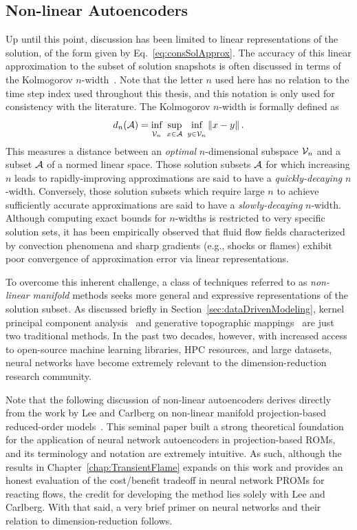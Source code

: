 \subsection{Non-linear Autoencoders}\label{subsec:nonlinManifold}

Up until this point, discussion has been limited to linear representations of the solution, of the form given by Eq.~\ref{eq:consSolApprox}. The accuracy of this linear approximation to the subset of solution snapshots is often discussed in terms of the Kolmogorov $n$-width~\cite{Pinkus1985}. Note that the letter $n$ used here has no relation to the time step index used throughout this thesis, and this notation is only used for consistency with the literature. The Kolmogorov $n$-width is formally defined as
%
\begin{equation}\label{eq:nwidth}
    d_n(\mathcal{A}) = \underset{\mathcal{V}_n}{\vphantom{sup}\text{inf}} \enspace \underset{x \in \mathcal{A}}{\text{sup}} \enspace \underset{y \in \mathcal{V}_n}{\vphantom{sup}\text{inf}} \left\Vert x - y \right\Vert.
\end{equation}
%
This measures a distance between an \textit{optimal} $n$-dimensional subspace $\mathcal{V}_n$ and a subset $\mathcal{A}$ of a normed linear space. Those solution subsets $\mathcal{A}$ for which increasing $n$ leads to rapidly-improving approximations are said to have a \textit{quickly-decaying} $n$-width. Conversely, those solution subsets which require large $n$ to achieve sufficiently accurate approximations are said to have a \textit{slowly-decaying} $n$-width. Although computing exact bounds for $n$-widths is restricted to very specific solution sets, it has been empirically observed that fluid flow fields characterized by convection phenomena and sharp gradients (e.g., shocks or flames) exhibit poor convergence of approximation error via linear representations.

To overcome this inherent challenge, a class of techniques referred to as \textit{non-linear manifold} methods seeks more general and expressive representations of the solution subset. As discussed briefly in Section~\ref{sec:dataDrivenModeling}, kernel principal component analysis~\cite{kernelPCA} and generative topographic mappings~\cite{Bishop1997} are just two traditional methods. In the past two decades, however, with increased access to open-source machine learning libraries, HPC resources, and large datasets, neural networks have become extremely relevant to the dimension-reduction research community.

Note that the following discussion of non-linear autoencoders derives directly from the work by Lee and Carlberg on non-linear manifold projection-based reduced-order models~\cite{Lee2020}. This seminal paper built a strong theoretical foundation for the application of neural network autoencoders in projection-based ROMs, and its terminology and notation are extremely intuitive. As such, although the results in Chapter~\ref{chap:TransientFlame} expands on this work and provides an honest evaluation of the cost/benefit tradeoff in neural network PROMs for reacting flows, the credit for developing the method lies solely with Lee and Carlberg. With that said, a very brief primer on neural networks and their relation to dimension-reduction follows.

